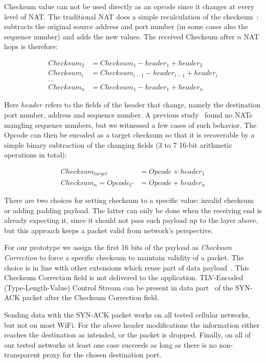 \documentclass{sig-alternate-10pt}
\begin{document}
Checksum value can not be used directly as an opcode since it changes at every level of NAT. The traditional NAT does a simple recalculation of the checksum~\cite{Egevang:tu}: subtracts the original source address and port number (in some cases also the sequence number) and adds the new values. The received Checksum after \(n\) NAT hops is therefore:

\vspace{-2mm}
\begin{align*}
Checksum_2 & = Checksum_1 - header_1 + header_2 \\
Checksum_i & = Checksum_{i-1} - header_{i-1} + header_i \\
 ... \\
Checksum_n & = Checksum_1 - header_1 + header_n
\end{align*}

Here $header$ refers to the fields of the header that change, namely the destination port number, address and sequence number. A previous study~\cite{UntoldMiddlebox2011} found no NATs mangling sequence numbers, but we witnessed a few cases of such behavior. The Opcode can then be encoded as a target checksum so that it is recoverable by a simple binary subtraction of the changing fields (3 to 7 16-bit arithmetic operations in total):

\vspace{-2mm}
\begin{align*}
Checksum_{target} & = Opcode + header_1 \\
Checksum_n = Opcode_C & = Opcode + header_n
\end{align*}

There are two choices for setting checksum to a specific value: invalid checksum or adding padding payload. The latter can only be done when the receiving end is already expecting it, since it should not pass such payload up to the layer above, but this approach keeps a packet valid from network's perspective.

For our prototype we assign the first 16 bits of the payload as \emph{Checksum Correction} to force a specific checksum to maintain validity of a packet. The choice is in line with other extensions which reuse part of data payload~\cite{Mazieres:uz,Bonaventure:wx}. This Checksum Correction field is not delivered to the application. TLV-Encoded (Type-Length-Value) Control Stream can be present in data part~\cite{Bonaventure:wx} of the SYN-ACK packet after the Checksum Correction field.

Sending data with the SYN-ACK packet works on all tested cellular networks, but not on most WiFi. For the above header modifications the information either reaches the destination as intended, or the packet is dropped. Finally, on all of our tested networks at least one case succeeds as long as there is no non-transparent proxy for the chosen destination port.
\end{document}
